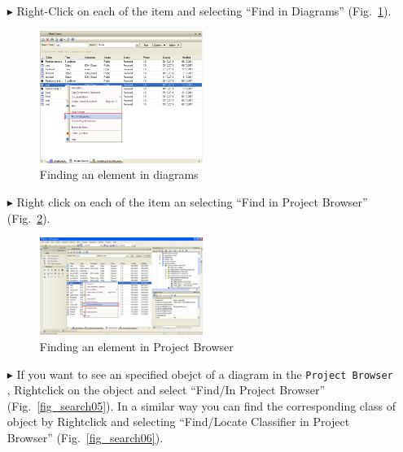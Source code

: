 \begin{enumerate}
\item[$\blacktriangleright$]Right-Click on each of the item and selecting ``Find
in Diagrams'' (Fig.~\ref{fig_search03}). 
\begin{figure}[htbp]
\begin{center}
  \includegraphics[width=0.5\textwidth]{pics/tricks/search/search3}
  \caption{Finding an element in diagrams}  
  \label{fig_search03}
\end{center}
\end{figure}

\item[$\blacktriangleright$]Right click on each of the item an selecting ``Find in
Project Browser'' (Fig.~\ref{fig_search04}). 
\begin{figure}[htbp]
\begin{center}
  \includegraphics[width=0.5\textwidth]{pics/tricks/search/search4}
  \caption{Finding an element in Project Browser}  
  \label{fig_search04}
\end{center}
\end{figure}

\item[$\blacktriangleright$]If you want to see an specified obejct of a diagram
in the \texttt{Project Browser} , Rightclick on the object and select ``Find/In Project
Browser'' (Fig.~\ref{fig_search05}). In a similar way you can find the
corresponding class of object by Rightclick and selecting ``Find/Locate
Classifier in Project Browser'' (Fig.~\ref{fig_search06}).


\end{enumerate}
